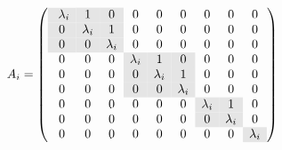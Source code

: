 \begin{definition}
	\[A_i = \left(\begin{array}{*9{c}}\
				\cellcolor{Gray}\lambda_i & \cellcolor{Gray}1         & \cellcolor{Gray}0         & 0                         & 0                         & 0                         & 0                         & 0                         & 0                         \\
				\cellcolor{Gray}0         & \cellcolor{Gray}\lambda_i & \cellcolor{Gray}1         & 0                         & 0                         & 0                         & 0                         & 0                         & 0                         \\
				\cellcolor{Gray}0         & \cellcolor{Gray}0         & \cellcolor{Gray}\lambda_i & 0                         & 0                         & 0                         & 0                         & 0                         & 0                         \\
				0                         & 0                         & 0                         & \cellcolor{Gray}\lambda_i & \cellcolor{Gray}1         & \cellcolor{Gray}0         & 0                         & 0                         & 0                         \\
				0                         & 0                         & 0                         & \cellcolor{Gray}0         & \cellcolor{Gray}\lambda_i & \cellcolor{Gray}1         & 0                         & 0                         & 0                         \\
				0                         & 0                         & 0                         & \cellcolor{Gray}0         & \cellcolor{Gray}0         & \cellcolor{Gray}\lambda_i & 0                         & 0                         & 0                         \\
				0                         & 0                         & 0                         & 0                         & 0                         & 0                         & \cellcolor{Gray}\lambda_i & \cellcolor{Gray}1         & 0                         \\
				0                         & 0                         & 0                         & 0                         & 0                         & 0                         & \cellcolor{Gray}0         & \cellcolor{Gray}\lambda_i & 0                         \\
				0                         & 0                         & 0                         & 0                         & 0                         & 0                         & 0                         & 0                         & \cellcolor{Gray}\lambda_i
			\end{array}\right)\]


\end{definition}
